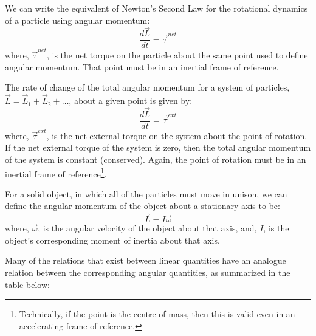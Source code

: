 We can write the equivalent of Newton's Second Law for the rotational dynamics of a particle using angular momentum:
\begin{equation}
\frac{d\vec L}{dt}=\vec\tau^{net}
\end{equation}
where, $\vec \tau^{net}$, is the net torque on the particle about the same point used to define angular momentum. That point must be in an inertial frame of reference.

The rate of change of the total angular momentum for a system of particles, $\vec L=\vec L_1 + \vec L_2 +\dots$, about a given point is given by:
\begin{equation}
\frac{d\vec L}{dt}=\vec\tau^{ext}
\end{equation}
where, $\vec\tau^{ext}$, is the net external torque on the system about the point of rotation. If the net external torque of the system is zero, then the total angular momentum of the system is constant (conserved). Again, the point of rotation must be in an inertial frame of reference\footnote{Technically, if the point is the centre of mass, then this is valid even in an accelerating frame of reference.}.

For a solid object, in which all of the particles must move in unison, we can define the angular momentum of the object about a stationary axis to be:
\begin{equation}
\vec L = I\vec \omega
\end{equation}
where, $\vec\omega$, is the angular velocity of the object about that axis, and, $I$, is the object's corresponding moment of inertia about that axis.

Many of the relations that exist between linear quantities have an analogue relation between the corresponding angular quantities, as summarized in the table below:

